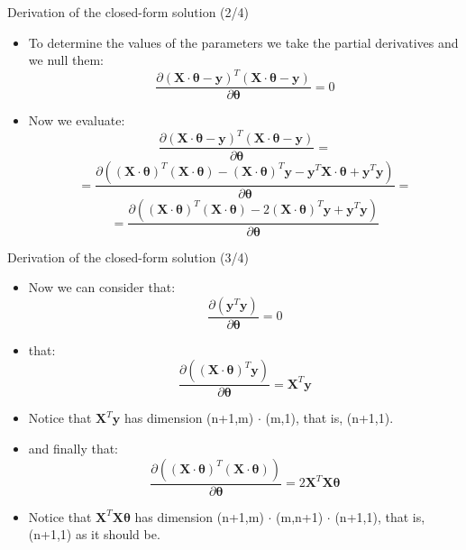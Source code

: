 \documentclass{beamer}
\begin{document}
\begin{frame}
{\centerline{Derivation of the closed-form solution  (2/4) }}

\begin{itemize}
\item To determine the values of the parameters we take the partial derivatives and we null them:
$$ \frac{ \partial  (\boldsymbol X \cdot \boldsymbol \theta - \boldsymbol y)^T (\boldsymbol X \cdot \boldsymbol \theta - \boldsymbol y)} { \partial \boldsymbol \theta} = 0 $$
\item Now we evaluate:
$$ \frac{ \partial  (\boldsymbol X \cdot \boldsymbol \theta - \boldsymbol y)^T (\boldsymbol X \cdot \boldsymbol \theta - \boldsymbol y)} { \partial \boldsymbol \theta} = $$
 $$ = \frac{\partial (
 (\boldsymbol X \cdot \boldsymbol \theta)^T (\boldsymbol X \cdot \boldsymbol \theta) -
 (\boldsymbol X \cdot \boldsymbol \theta)^T \boldsymbol y -
 \boldsymbol y^T\boldsymbol X \cdot \boldsymbol \theta +
  \boldsymbol y^T \boldsymbol y
 )}
 { \partial \boldsymbol \theta} = $$
  $$ = \frac{\partial (
 (\boldsymbol X \cdot \boldsymbol \theta)^T (\boldsymbol X \cdot \boldsymbol \theta) -
 2 (\boldsymbol X \cdot \boldsymbol \theta)^T \boldsymbol y +
  \boldsymbol y^T \boldsymbol y
 )}
 { \partial \boldsymbol \theta} $$

\end{itemize}

\end{frame}

\begin{frame}
{\centerline{Derivation of the closed-form solution  (3/4) }}

\begin{itemize}
\item Now we can consider that:
  $$ \frac{\partial (  \boldsymbol y^T \boldsymbol y )}
 { \partial \boldsymbol \theta} = 0 $$
 \item that:
  $$ \frac{\partial (
  (\boldsymbol X \cdot \boldsymbol \theta)^T \boldsymbol y
 )}
 { \partial \boldsymbol \theta} = \boldsymbol X^T \boldsymbol y$$
 \item Notice that $\boldsymbol X^T \boldsymbol y$ has dimension (n+1,m) $\cdot$ (m,1), that is, (n+1,1).

 \item and finally that:
  $$ \frac{\partial (
 (\boldsymbol X \cdot \boldsymbol \theta)^T (\boldsymbol X \cdot \boldsymbol \theta) )}
 { \partial \boldsymbol \theta} = 2  \boldsymbol X^T  \boldsymbol X \boldsymbol \theta $$
 \item Notice that $\boldsymbol X^T \boldsymbol X \boldsymbol \theta$ has dimension (n+1,m) $\cdot$ (m,n+1)  $\cdot$ (n+1,1), that is, (n+1,1) as it should be.

\end{itemize}

\end{frame}
\end{document}
